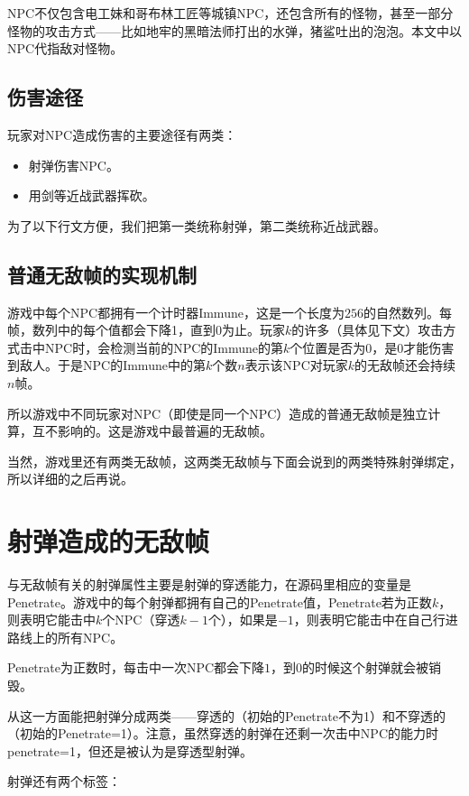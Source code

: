 NPC不仅包含电工妹和哥布林工匠等城镇NPC，还包含所有的怪物，甚至一部分怪物的攻击方式——比如地牢的黑暗法师打出的水弹，猪鲨吐出的泡泡。本文中以NPC代指敌对怪物。

\subsection{伤害途径}

玩家对NPC造成伤害的主要途径有两类：

\begin{itemize}
\item 射弹伤害NPC。
\item 用剑等近战武器挥砍。
\end{itemize}

为了以下行文方便，我们把第一类统称射弹，第二类统称近战武器。

\subsection{普通无敌帧的实现机制}

游戏中每个NPC都拥有一个计时器Immune，这是一个长度为$256$的自然数列。每帧，数列中的每个值都会下降1，直到0为止。玩家$k$的许多（具体见下文）攻击方式击中NPC时，会检测当前的NPC的Immune的第$k$个位置是否为$0$，是$0$才能伤害到敌人。于是NPC的Immune中的第$k$个数$n$表示该NPC对玩家$k$的无敌帧还会持续$n$帧。

所以游戏中不同玩家对NPC（即使是同一个NPC）造成的普通无敌帧是独立计算，互不影响的。这是游戏中最普遍的无敌帧。

当然，游戏里还有两类无敌帧，这两类无敌帧与下面会说到的两类特殊射弹绑定，所以详细的之后再说。

\section{射弹造成的无敌帧}

与无敌帧有关的射弹属性主要是射弹的穿透能力，在源码里相应的变量是Penetrate。游戏中的每个射弹都拥有自己的Penetrate值，Penetrate若为正数$k$，则表明它能击中$k$个NPC（穿透$k-1$个），如果是$-1$，则表明它能击中在自己行进路线上的所有NPC。

Penetrate为正数时，每击中一次NPC都会下降$1$，到$0$的时候这个射弹就会被销毁。

从这一方面能把射弹分成两类——穿透的（初始的Penetrate不为1）和不穿透的（初始的Penetrate=1）。注意，虽然穿透的射弹在还剩一次击中NPC的能力时penetrate=1，但还是被认为是穿透型射弹。

射弹还有两个标签：

